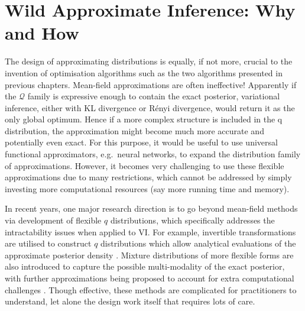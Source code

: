 \chapter{Wild Approximate Inference: Why and How}
\label{chap:wild}

\ifpdf
    \graphicspath{{Chapter5/figs/Raster/}{Chapter5/figs/PDF/}{Chapter5/figs/}}
\else
    \graphicspath{{Chapter5/figs/Vector/}{Chapter5/figs/}}
\fi

The design of approximating distributions is equally, if not more, crucial to the invention of optimisation algorithms such as the two algorithms presented in previous chapters. Mean-field approximations are often ineffective! Apparently if the $\mathcal{Q}$ family is expressive enough to contain the exact posterior, variational inference, either with KL divergence or R{\'e}nyi divergence, would return it as the only global optimum. Hence if a more complex structure is included in the q distribution, the approximation might become much more accurate and potentially even exact. For this purpose, it would be useful to use universal functional approximators, e.g.~neural networks, to expand the distribution family of approximations. However, it becomes very challenging to use these flexible approximations due to many restrictions, which cannot be addressed by simply investing more computational resources (say more running time and memory). 

In recent years, one major research direction is to go beyond mean-field methods via development of flexible $q$ distributions, which specifically addresses the intractability issues when applied to VI. For example, invertible transformations are utilised to construct $q$ distributions which allow analytical evaluations of the approximate posterior density \citep{rezende:flow2015, kingma:iaf2016, louizos:multiplicative2017}. Mixture distributions of more flexible forms are also introduced to capture the possible multi-modality of the exact posterior, with further approximations being proposed to account for extra computational challenges \citep{salimans:mcmcvi2015, tran:vgp2016, ranganath:hvm2016,maaloe:agdm2016}. Though effective, these methods are complicated for practitioners to understand, let alone the design work itself that requires lots of care.

